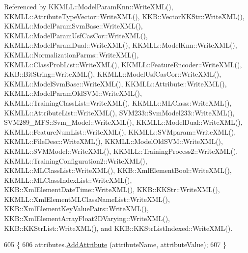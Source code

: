Referenced by K\+K\+M\+L\+L\+::\+Model\+Param\+Knn\+::\+Write\+X\+M\+L(), K\+K\+M\+L\+L\+::\+Attribute\+Type\+Vector\+::\+Write\+X\+M\+L(), K\+K\+B\+::\+Vector\+K\+K\+Str\+::\+Write\+X\+M\+L(), K\+K\+M\+L\+L\+::\+Model\+Param\+Svm\+Base\+::\+Write\+X\+M\+L(), K\+K\+M\+L\+L\+::\+Model\+Param\+Usf\+Cas\+Cor\+::\+Write\+X\+M\+L(), K\+K\+M\+L\+L\+::\+Model\+Param\+Dual\+::\+Write\+X\+M\+L(), K\+K\+M\+L\+L\+::\+Model\+Knn\+::\+Write\+X\+M\+L(), K\+K\+M\+L\+L\+::\+Normalization\+Parms\+::\+Write\+X\+M\+L(), K\+K\+M\+L\+L\+::\+Class\+Prob\+List\+::\+Write\+X\+M\+L(), K\+K\+M\+L\+L\+::\+Feature\+Encoder\+::\+Write\+X\+M\+L(), K\+K\+B\+::\+Bit\+String\+::\+Write\+X\+M\+L(), K\+K\+M\+L\+L\+::\+Model\+Usf\+Cas\+Cor\+::\+Write\+X\+M\+L(), K\+K\+M\+L\+L\+::\+Model\+Svm\+Base\+::\+Write\+X\+M\+L(), K\+K\+M\+L\+L\+::\+Attribute\+::\+Write\+X\+M\+L(), K\+K\+M\+L\+L\+::\+Model\+Param\+Old\+S\+V\+M\+::\+Write\+X\+M\+L(), K\+K\+M\+L\+L\+::\+Training\+Class\+List\+::\+Write\+X\+M\+L(), K\+K\+M\+L\+L\+::\+M\+L\+Class\+::\+Write\+X\+M\+L(), K\+K\+M\+L\+L\+::\+Attribute\+List\+::\+Write\+X\+M\+L(), S\+V\+M233\+::\+Svm\+Model233\+::\+Write\+X\+M\+L(), S\+V\+M289\+\_\+\+M\+F\+S\+::\+Svm\+\_\+\+Model\+::\+Write\+X\+M\+L(), K\+K\+M\+L\+L\+::\+Model\+Dual\+::\+Write\+X\+M\+L(), K\+K\+M\+L\+L\+::\+Feature\+Num\+List\+::\+Write\+X\+M\+L(), K\+K\+M\+L\+L\+::\+S\+V\+Mparam\+::\+Write\+X\+M\+L(), K\+K\+M\+L\+L\+::\+File\+Desc\+::\+Write\+X\+M\+L(), K\+K\+M\+L\+L\+::\+Model\+Old\+S\+V\+M\+::\+Write\+X\+M\+L(), K\+K\+M\+L\+L\+::\+S\+V\+M\+Model\+::\+Write\+X\+M\+L(), K\+K\+M\+L\+L\+::\+Training\+Process2\+::\+Write\+X\+M\+L(), K\+K\+M\+L\+L\+::\+Training\+Configuration2\+::\+Write\+X\+M\+L(), K\+K\+M\+L\+L\+::\+M\+L\+Class\+List\+::\+Write\+X\+M\+L(), K\+K\+B\+::\+Xml\+Element\+Bool\+::\+Write\+X\+M\+L(), K\+K\+M\+L\+L\+::\+M\+L\+Class\+Index\+List\+::\+Write\+X\+M\+L(), K\+K\+B\+::\+Xml\+Element\+Date\+Time\+::\+Write\+X\+M\+L(), K\+K\+B\+::\+K\+K\+Str\+::\+Write\+X\+M\+L(), K\+K\+M\+L\+L\+::\+Xml\+Element\+M\+L\+Class\+Name\+List\+::\+Write\+X\+M\+L(), K\+K\+B\+::\+Xml\+Element\+Key\+Value\+Pairs\+::\+Write\+X\+M\+L(), K\+K\+B\+::\+Xml\+Element\+Array\+Float2\+D\+Varying\+::\+Write\+X\+M\+L(), K\+K\+B\+::\+K\+K\+Str\+List\+::\+Write\+X\+M\+L(), and K\+K\+B\+::\+K\+K\+Str\+List\+Indexed\+::\+Write\+X\+M\+L().


\begin{DoxyCode}
605 \{
606   attributes.\hyperlink{class_k_k_b_1_1_xml_attribute_list_ab3eb98b55d4874281ba91c342422bd83}{AddAttribute} (attributeName, attributeValue);
607 \}
\end{DoxyCode}
